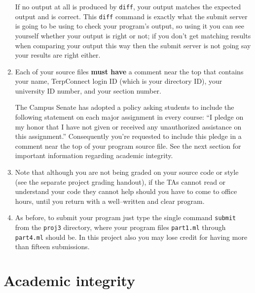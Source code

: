 \documentclass[11pt]{article}
\begin{document}
\begin{enumerate}
            If no output at all is produced by \texttt{diff}, your output
            matches the expected output and is correct.  This \texttt{diff}
            command is exactly what the submit server is going to be using
            to check your program's output, so using it you can see yourself
            whether your output is right or not; if you don't get matching
            results when comparing your output this way then the submit
            server is not going say your results are right either.

      \item Each of your source files \textbf{must have} a comment near the
            top that contains your name, TerpConnect login ID (which is your
            directory ID), your university ID number, and your section
            number.

            The Campus Senate has adopted a policy asking students to
            include the following statement on each major assignment in
            every course: ``I pledge on my honor that I have not given or
            received any unauthorized assistance on this assignment.''
            Consequently you're requested to include this pledge in a
            comment near the top of your program source file.  See the next
            section for important information regarding academic integrity.

      \item Note that although you are not being graded on your source code
            or style (see the separate project grading handout), if the TAs
            cannot read or understand your code they cannot help should you
            have to come to office hours, until you return with a
            well--written and clear program.

      \item As before, to submit your program just type the single command
            \texttt{submit} from the \texttt{proj3} directory, where your
            program files \texttt{part1.ml} through \texttt{part4.ml} should
            be.  In this project also you may lose credit for having more
            than fifteen submissions.

    \end{enumerate}

    \vspace{-4.5mm}

  \section{Academic integrity}
\end{document}
